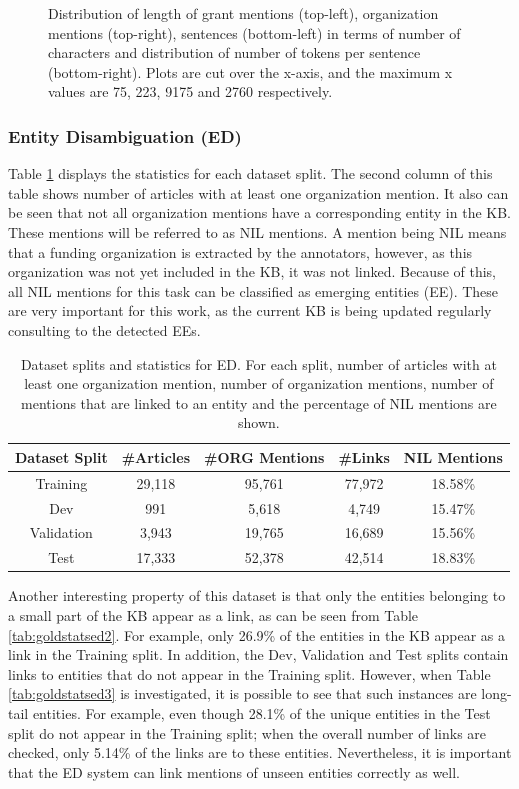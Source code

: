 \documentclass{report}
\theoremstyle{definition}
\theoremstyle{remark}
\begin{document}
\begin{figure}
    \caption{Distribution of length of grant mentions (top-left), organization mentions (top-right), sentences (bottom-left) in terms of number of characters and distribution of number of tokens per sentence (bottom-right). Plots are cut over the x-axis, and the maximum x values are 75, 223, 9175 and 2760 respectively.}
    \label{fig:nerdatalen}
\end{figure}

\subsubsection{Entity Disambiguation (ED)}
Table \ref{tab:goldstatsed} displays the statistics for each dataset split. The second column of this table shows number of articles with at least one organization mention. It also can be seen that not all organization mentions have a corresponding entity in the KB. These mentions will be referred to as NIL mentions. A mention being NIL means that a funding organization is extracted by the annotators, however, as this organization was not yet included in the KB, it was not linked. Because of this, all NIL mentions for this task can be classified as emerging entities (EE). These are very important for this work, as the current KB is being updated regularly consulting to the detected EEs.

\begin{table}[h!]
    \centering
    \begin{tabular}{ccccc}
    Dataset Split & \#Articles & \#ORG Mentions & \#Links & NIL Mentions  \\
    \hline
    Training & 29,118 & 95,761 & 77,972 & 18.58\% \\
    Dev & 991 & 5,618 & 4,749 & 15.47\% \\
    Validation & 3,943 & 19,765 & 16,689 & 15.56\% \\
    Test & 17,333 & 52,378 & 42,514 & 18.83\% \\ 
    \end{tabular}
    \caption{Dataset splits and statistics for ED. For each split, number of articles with at least one organization mention, number of organization mentions, number of mentions that are linked to an entity and the percentage of NIL mentions are shown.}
    \label{tab:goldstatsed}
\end{table}

Another interesting property of this dataset is that only the entities belonging to a small part of the KB appear as a link, as can be seen from Table \ref{tab:goldstatsed2}. For example, only 26.9\% of the entities in the KB appear as a link in the Training split. In addition, the  Dev, Validation and Test splits contain links to entities that do not appear in the Training split. However, when  Table \ref{tab:goldstatsed3} is investigated, it is possible to see that such instances are long-tail entities. For example, even though 28.1\% of the unique entities in the Test split do not appear in the Training split; when the overall number of links are checked, only 5.14\% of the links are to these entities. Nevertheless, it is important that the ED system can link mentions of unseen entities correctly as well.
\end{document}
